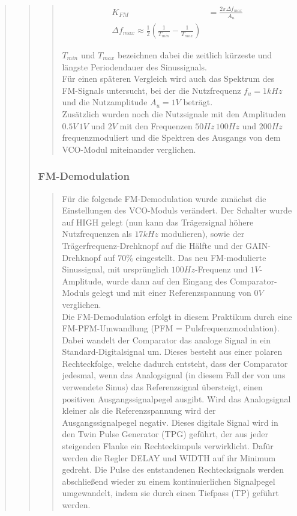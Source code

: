 \begin{quote}
\begin{quote}
\begin{quote}
        \begin{equation*}
    	\begin{split}
    		K_{FM} &= \frac{2 \pi \Delta f_{max}}{A_u}\\
			\Delta f_{max} \approx \frac{1}{2} (\frac{1}{T_{min}} - \frac{1}{T_{max}})    		
    	\end{split}
    	\end{equation*}
    	
   		$T_{min}$ und $T_{max}$ bezeichnen dabei die zeitlich kürzeste und längste
   		Periodendauer des Sinussignals.\\
   		Für einen späteren Vergleich wird auch das Spektrum des FM-Signals
   		untersucht, bei der die Nutzfrequenz $f_u = 1 kHz$ und die Nutzamplitude
   		$A_u = 1 V$ beträgt.\\
   		Zusätzlich wurden noch die Nutzsignale mit den Amplituden $0.5 V\, 1 V$ und
   		$2 V$ mit den Frequenzen $50 Hz\, 100 Hz$ und $200 Hz$ frequenzmoduliert
   		und die Spektren des Ausgangs von dem VCO-Modul miteinander verglichen. 
        \end{quote}
        
        \subsubsection{FM-Demodulation}
        \begin{quote}
        Für die folgende FM-Demodulation wurde zunächst die Einstellungen des
        VCO-Moduls verändert. Der Schalter wurde auf HIGH gelegt (nun kann das
        Trägersignal höhere Nutzfrequenzen als $17 kHz$ modulieren), sowie der
        Trägerfrequenz-Drehknopf auf die Hälfte und der GAIN-Drehknopf auf $70
        \%$ eingestellt. Das neu FM-modulierte Sinussignal, mit ursprünglich
        $100 Hz$-Frequenz und $1 V$-Amplitude, wurde dann auf den Eingang des
        Comparator-Moduls gelegt und mit einer Referenzspannung von $0 V$
        verglichen.\\
        
        Die FM-Demodulation erfolgt in diesem Praktikum durch eine
        FM-PFM-Umwandlung (PFM = Pulsfrequenzmodulation). Dabei wandelt der
        Comparator das analoge Signal in ein Standard-Digitalsignal um. Dieses
        besteht aus einer polaren Rechteckfolge, welche dadurch entsteht, dass
        der Comparator jedesmal, wenn das Analogsignal (in diesem Fall der
        von uns verwendete Sinus) das Referenzsignal übersteigt, einen positiven
        Ausgangssignalpegel ausgibt. Wird das Analogsignal kleiner als die
        Referenzspannung wird der Ausgangssignalpegel negativ. Dieses digitale
        Signal wird in den Twin Pulse Generator (TPG) geführt, der aus jeder
        steigenden Flanke ein Rechteckimpuls verwirklicht. Dafür werden die
        Regler DELAY und WIDTH auf ihr Minimum gedreht. Die Pulse des
        entstandenen Rechtecksignals werden abschließend wieder zu einem kontinuierlichen 
        Signalpegel umgewandelt, indem sie durch einen Tiefpass
        (TP) geführt werden.\\
        

\end{quote}
\end{quote}
\end{quote}
